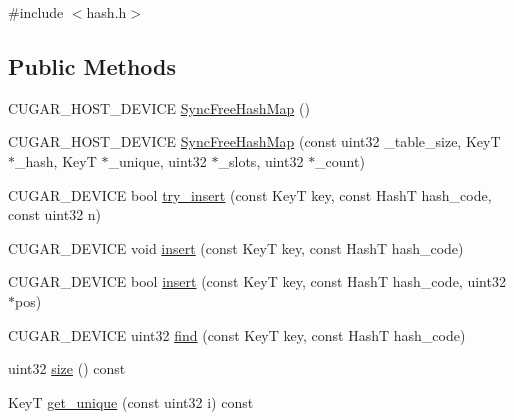 {\ttfamily \#include $<$hash.\+h$>$}

\subsection*{Public Methods}
\begin{DoxyCompactItemize}
\item 
C\+U\+G\+A\+R\+\_\+\+H\+O\+S\+T\+\_\+\+D\+E\+V\+I\+CE \hyperlink{structcugar_1_1cuda_1_1_sync_free_hash_map_a27411b5878e84ffb98ddcde4ef660409}{Sync\+Free\+Hash\+Map} ()
\item 
C\+U\+G\+A\+R\+\_\+\+H\+O\+S\+T\+\_\+\+D\+E\+V\+I\+CE \hyperlink{structcugar_1_1cuda_1_1_sync_free_hash_map_abb195d74c19002c772c3ca6013e4d72f}{Sync\+Free\+Hash\+Map} (const uint32 \+\_\+table\+\_\+size, KeyT $\ast$\+\_\+hash, KeyT $\ast$\+\_\+unique, uint32 $\ast$\+\_\+slots, uint32 $\ast$\+\_\+count)
\item 
C\+U\+G\+A\+R\+\_\+\+D\+E\+V\+I\+CE bool \hyperlink{structcugar_1_1cuda_1_1_sync_free_hash_map_a2de3977000dd6f1c4912e0e17667f014}{try\+\_\+insert} (const KeyT key, const HashT hash\+\_\+code, const uint32 n)
\item 
C\+U\+G\+A\+R\+\_\+\+D\+E\+V\+I\+CE void \hyperlink{structcugar_1_1cuda_1_1_sync_free_hash_map_aa3c8cdbaaeceb10563b073635b230d9c}{insert} (const KeyT key, const HashT hash\+\_\+code)
\item 
C\+U\+G\+A\+R\+\_\+\+D\+E\+V\+I\+CE bool \hyperlink{structcugar_1_1cuda_1_1_sync_free_hash_map_a847457f92899ca5af002b7f320b6173f}{insert} (const KeyT key, const HashT hash\+\_\+code, uint32 $\ast$pos)
\item 
C\+U\+G\+A\+R\+\_\+\+D\+E\+V\+I\+CE uint32 \hyperlink{structcugar_1_1cuda_1_1_sync_free_hash_map_ab18b0af6061e752201eb9ca8623c963d}{find} (const KeyT key, const HashT hash\+\_\+code)
\item 
uint32 \hyperlink{structcugar_1_1cuda_1_1_sync_free_hash_map_a9d8de7a5b7d5fafc634866a12def9eae}{size} () const
\item 
KeyT \hyperlink{structcugar_1_1cuda_1_1_sync_free_hash_map_aebddbad188e72e6f6bb5697f2e758d03}{get\+\_\+unique} (const uint32 i) const
\end{DoxyCompactItemize}
